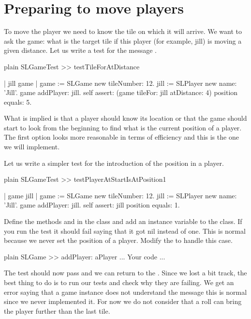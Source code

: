 \documentclass[10pt,twoside,english]{_support/latex/sbabook/sbabook}
\begin{document}
\section{Preparing to move players}
To move the player we need to know the tile on which it will arrive.  We want to ask the game: what is the target tile if this player (for example, jill) is moving a given distance.
Let us write a test for the message .

\begin{displaycode}{plain}
SLGameTest >> testTileForAtDistance
	
	| jill game |
	game := SLGame new tileNumber: 12.
	jill := SLPlayer new name: 'Jill'.
	game addPlayer: jill. 
	self assert: (game tileFor: jill atDistance: 4) position equals: 5.
\end{displaycode}

What is implied is that a player should know its location or that the game should start to look from the beginning to find what is the current position of a player. 
The first option looks more reasonable in terms of efficiency and this is the one we will implement. 

Let us write a simpler test for the introduction of the position in a player. 

\begin{displaycode}{plain}
SLGameTest >> testPlayerAtStartIsAtPosition1

	| game jill |
	game := SLGame new tileNumber: 12.
	jill := SLPlayer new name: 'Jill'.
	game addPlayer: jill.
	self assert: jill position equals: 1.
\end{displaycode}

Define the methods  and  in the class  and add an instance
variable  to the class. If you run the test it should fail saying that it got nil instead of one. This is normal because we never set the position of a player.
Modify the  to handle this case. 

\begin{displaycode}{plain}
SLGame >> addPlayer: aPlayer
	... Your code ...
\end{displaycode}

The test  should now pass and we can return to the . Since we lost a bit track, the best thing to do is to run our tests and check why they are failing. 
We get an error saying that a game instance does not understand the message  this is normal since we never implemented it.
For now we do not consider that a roll can bring the player further than the last tile.
\end{document}
